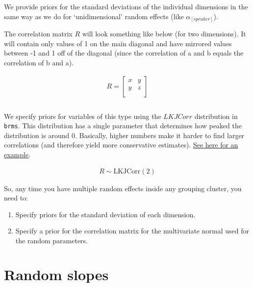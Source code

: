 \documentclass[
]{book}
\begin{document}
We provide priors for the standard deviations of the individual dimensions in the same way as we do for `unidimensional' random effects (like \(\alpha_{[speaker]}\)).

The correlation matrix \(R\) will look something like below (for two dimensions). It will contain only values of 1 on the main diagonal and have mirrored values between -1 and 1 off of the diagonal (since the correlation of a and b equals the correlation of b and a).

\begin{equation}
\begin{split}
R = \begin{bmatrix} x & y \\ y & z \\ \end{bmatrix} \\ \\
\end{split}
\label{eq:67}
\end{equation}

We specify priors for variables of this type using the \(LKJCorr\) distribution in \texttt{brms}. This distribution has a single parameter that determines how peaked the distribution is around 0. Basically, higher numbers make it harder to find larger correlations (and therefore yield more conservative estimates). \href{https://eager-roentgen-523c83.netlify.app/2014/12/27/d-lkj-priors/}{See here for an example}.

\begin{equation}
\begin{split}
R \sim \mathrm{LKJCorr} (2)
\end{split}
\label{eq:672}
\end{equation}

So, any time you have multiple random effects inside any grouping cluster, you need to:

\begin{enumerate}
\def\labelenumi{\arabic{enumi})}
\item
  Specify priors for the standard deviation of each dimension.
\item
  Specify a prior for the correlation matrix for the multivariate normal used for the random parameters.
\end{enumerate}

\hypertarget{random-slopes-1}{%
\section{Random slopes}\label{random-slopes-1}}
\end{document}

